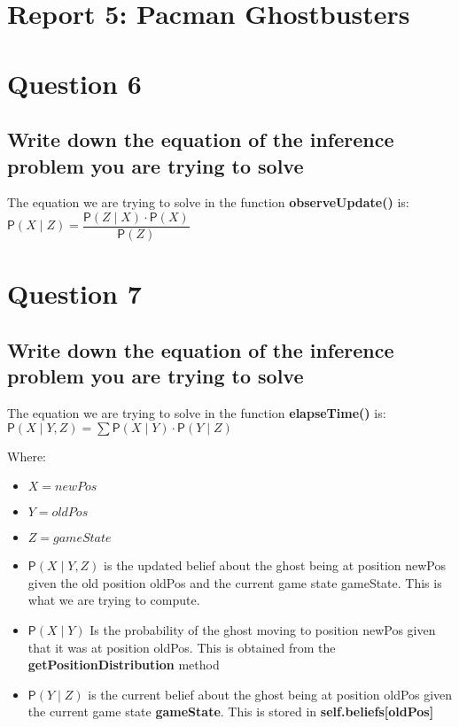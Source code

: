 \documentclass[11pt]{article}
\newcommand*{\prob}[1]{\ensuremath{\mathsf{P}(#1)}}
\begin{document}
\section*{Report 5: Pacman Ghostbusters}

\section*{Question 6}
\subsection*{Write down the equation of the inference problem you are trying to solve}
The equation we are trying to solve in the function \textbf{observeUpdate()} is:\\
    $ \prob{X \mid Z} = \dfrac{\prob{Z \mid X} \cdot \prob{X}}{\prob{Z}} $

\section*{Question 7}
\subsection*{Write down the equation of the inference problem you are trying to solve}
The equation we are trying to solve in the function \textbf{elapseTime()} is:\\

    $ \prob{X \mid Y, Z} = \sum \prob{X \mid Y} \cdot \prob{Y \mid Z} $

Where:\\
\begin{itemize}
\item $ X = newPos $
\item $ Y = oldPos $
\item $ Z = gameState $
\item $ \prob{X \mid Y, Z} $ is the updated belief about the ghost being at position newPos given the old position oldPos and the current game state gameState.
This is what we are trying to compute.
\item $ \prob{X \mid Y} $ Is the probability of the ghost moving to position newPos given that it was at position oldPos.
This is obtained from the \textbf{getPositionDistribution} method
\item $ \prob{Y \mid Z} $ is the current belief about the ghost being at position oldPos given the current game state \textbf{gameState}.
This is stored in \textbf{self.beliefs[oldPos]}
\end{itemize}
\end{document}
